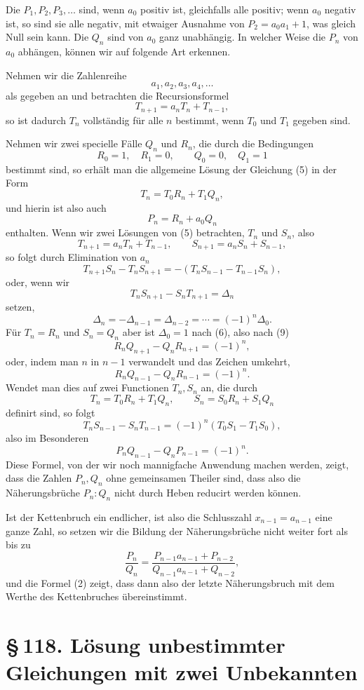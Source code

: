 \documentclass[11pt]{article}
\providecommand{\sect}[2]{\section*{\S\,#1. #2}}
\begin{document}
Die $P_1,P_2,P_3,\ldots$ sind, wenn $a_0$ positiv ist, gleichfalls alle positiv; wenn $a_0$ negativ ist, so sind sie alle negativ, mit etwaiger Ausnahme von $P_2=a_0a_1+1$, was gleich Null sein kann. Die $Q_n$ sind von $a_0$ ganz unabhängig. In welcher Weise die $P_n$ von $a_0$ abhängen, können wir auf folgende Art erkennen.

Nehmen wir die Zahlenreihe
\[
        a_1,a_2,a_3,a_4,\ldots
\]
als gegeben an und betrachten die Recursionsformel
\[
\tag{5}        T_{n+1}=a_nT_n+T_{n-1},
\]
so ist dadurch $T_n$ vollständig für alle $n$ bestimmt, wenn $T_0$ und $T_1$ gegeben sind.

Nehmen wir zwei specielle Fälle $Q_n$ und $R_n$, die durch die Bedingungen
\[
\tag{6}        R_0=1,\quad R_1=0,\qquad Q_0=0,\quad Q_1=1
\]
bestimmt sind, so erhält man die allgemeine Lösung der Gleichung (5) in der Form
\[
\tag{7}        T_n=T_0R_n+T_1Q_n,
\]
und hierin ist also auch
\[
\tag{8}        P_n=R_n+a_0Q_n
\]
enthalten. Wenn wir zwei Lösungen von (5) betrachten, $T_n$ und $S_n$, also
\[
        T_{n+1}=a_nT_n+T_{n-1},\qquad
        S_{n+1}=a_nS_n+S_{n-1},
\]
so folgt durch Elimination von $a_n$
\[
        T_{n+1}S_n-T_nS_{n+1}=-(T_nS_{n-1}-T_{n-1}S_n),
\]
oder, wenn wir
\[
        T_nS_{n+1}-S_nT_{n+1}=\Delta_n
\]
setzen,
\[
\tag{9}        \Delta_n=-\Delta_{n-1}=\Delta_{n-2}=\cdots=(-1)^n\Delta_0.
\]
Für $T_n=R_n$ und $S_n=Q_n$ aber ist $\Delta_0=1$ nach (6), also nach (9)
\[
        R_nQ_{n+1}-Q_nR_{n+1}=(-1)^n,
\]
oder, indem man $n$ in $n-1$ verwandelt und das Zeichen umkehrt,
\[
\tag{10}       R_nQ_{n-1}-Q_nR_{n-1}=(-1)^n.
\]
Wendet man dies auf zwei Functionen $T_n,S_n$ an, die durch
\[
        T_n=T_0R_n+T_1Q_n,
        \qquad
        S_n=S_0R_n+S_1Q_n
\]
definirt sind, so folgt
\[
        T_nS_{n-1}-S_nT_{n-1}=(-1)^n(T_0S_1-T_1S_0),
\]
also im Besonderen
\[
\tag{11}       P_nQ_{n-1}-Q_nP_{n-1}=(-1)^n.
\]
Diese Formel, von der wir noch mannigfache Anwendung machen werden, zeigt, dass die Zahlen $P_n,Q_n$ ohne gemeinsamen Theiler sind, dass also die Näherungsbrüche $P_n:Q_n$ nicht durch Heben reducirt werden können.

Ist der Kettenbruch ein endlicher, ist also die Schlusszahl $x_{n-1}=a_{n-1}$ eine ganze Zahl, so setzen wir die Bildung der Näherungsbrüche nicht weiter fort als bis zu
\[
        \frac{P_n}{Q_n}
        =\frac{P_{n-1}a_{n-1}+P_{n-2}}
               {Q_{n-1}a_{n-1}+Q_{n-2}},
\]
und die Formel (2) zeigt, dass dann also der letzte Näherungsbruch mit dem Werthe des Kettenbruches übereinstimmt.

\sect{118}{Lösung unbestimmter Gleichungen mit zwei Unbekannten}
\end{document}
